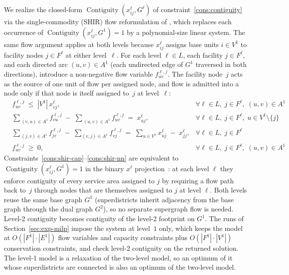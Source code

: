 \documentclass[11pt]{article}
\theoremstyle{definition}
\DeclareMathOperator{\Contiguity}{Contiguity}  %
\begin{document}
We realize the closed-form $\Contiguity(x^{\ell}_{ij}, G^\ell)$ of
constraint~\eqref{cons:contiguity} via the single-commodity (SHIR) flow
reformulation of \citet{shirabe2005model}, which replaces each occurrence of
$\Contiguity(x^{\ell}_{ij}, G^1) = 1$ by a polynomial-size linear system. The
same flow argument applies at both levels because $x^{\ell}_{ij}$ assigns base
units $i \in V^1$ to facility nodes $j \in F^{\ell}$ at either level~$\ell$.
For each level $\ell \in L$, each facility $j \in F^{\ell}$, and each directed
arc $(u, v) \in A^1$ (each undirected edge of $G^1$ traversed in both
directions), introduce a non-negative flow variable $f^{\ell,j}_{uv}$. The
facility node~$j$ acts as the source of one unit of flow per assigned node,
and flow is admitted into a node only if that node is itself assigned to~$j$
at level~$\ell$:
\begin{align}
   & f^{\ell,j}_{uv} \;\leq\; |V^1|\, x^{\ell}_{vj},
   &\forall \ell \in L,\; j \in F^{\ell},\; (u,v) \in A^1
     \label{cons:shir-cap} \\
   & \sum_{\,(v,u)\in A^1} f^{\ell,j}_{vu} \;-\;
     \sum_{\,(u,v)\in A^1} f^{\ell,j}_{uv} \;=\; x^{\ell}_{uj},
   &\forall \ell \in L,\; j \in F^{\ell},\; u \in V^1 \setminus \{j\}
     \label{cons:shir-cons} \\
   & \sum_{\,(j,v)\in A^1} f^{\ell,j}_{jv} \;-\;
     \sum_{(v,j)\in A^1} f^{\ell,j}_{vj} \;=\;
     \sum_{u \in V^1} x^{\ell}_{uj} \;-\; x^{\ell}_{jj},
   &\forall \ell \in L,\; j \in F^{\ell}
     \label{cons:shir-source} \\
   & f^{\ell,j}_{uv} \;\geq\; 0,
   &\forall \ell \in L,\; j \in F^{\ell},\; (u,v) \in A^1
     \label{cons:shir-nn}
\end{align}
Constraints~\eqref{cons:shir-cap}--\eqref{cons:shir-nn} are equivalent to
$\Contiguity(x^{\ell}_{i j}, G^1) = 1$ in the binary $x^{\ell}$
projection~\citep{validi2022imposing}: at each level $\ell$ they enforce
contiguity of every service area assigned to $j$ by requiring a flow path
back to~$j$ through nodes that are themselves assigned to $j$ at level
$\ell$. Both levels reuse the same base graph $G^1$ (superdistricts inherit
adjacency from the base graph through the dual graph $G^2$), so no separate supergraph flow is needed. Level-2 contiguity becomes contiguity of the level-2 footprint on $G^1$. The runs of Section~\ref{sec:exp-milp} impose the system at level~$1$ only, which keeps the model at $O(|F^{1}|\cdot|E^{1}|)$ flow variables and capacity constraints plus $O(|F^{1}|\cdot|V^{1}|)$ conservation constraints, and check level-2 contiguity on the returned solution. The level-1 model is a relaxation of the two-level model, so an optimum of it whose superdistricts are connected is also an optimum of the two-level model.
\end{document}
